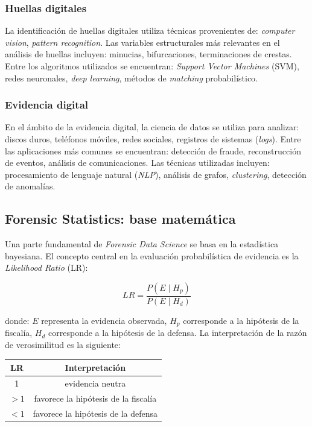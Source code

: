 \documentclass[a4paper,10pt,oneside]{article}
\begin{document}
\subsubsection*{Huellas digitales}

La identificaci\'on de huellas digitales utiliza t\'ecnicas provenientes de: \textit{computer vision}, \textit{pattern recognition}. Las variables estructurales m\'as relevantes en el an\'alisis de huellas incluyen: minucias, bifurcaciones, terminaciones de crestas. Entre los algoritmos utilizados se encuentran:  \textit{Support Vector Machines} (SVM), redes neuronales, \textit{deep learning}, m\'etodos de \textit{matching} probabil\'istico.

\subsubsection*{Evidencia digital}

En el \'ambito de la evidencia digital, la ciencia de datos se utiliza para analizar:  discos duros, tel\'efonos m\'oviles, redes sociales, registros de sistemas (\textit{logs}). Entre las aplicaciones m\'as comunes se encuentran: detecci\'on de fraude, reconstrucci\'on de eventos, an\'alisis de comunicaciones. Las t\'ecnicas utilizadas incluyen: procesamiento de lenguaje natural (\textit{NLP}), an\'alisis de grafos, \textit{clustering}, detecci\'on de anomal\'ias.

\subsection{Forensic Statistics: base matem\'atica}

Una parte fundamental de \textit{Forensic Data Science} se basa en la estad\'istica bayesiana.  El concepto central en la evaluaci\'on probabil\'istica de evidencia es la \textit{Likelihood Ratio} (LR):

\begin{equation}
LR = \frac{P(E \mid H_p)}{P(E \mid H_d)}
\end{equation}

donde: $E$ representa la evidencia observada, $H_p$ corresponde a la hip\'otesis de la fiscal\'ia, $H_d$ corresponde a la hip\'otesis de la defensa. La interpretaci\'on de la raz\'on de verosimilitud es la siguiente:

\begin{center}
\begin{tabular}{c c}
\hline
LR & Interpretaci\'on \\
\hline
1 & evidencia neutra \\
$>1$ & favorece la hip\'otesis de la fiscal\'ia \\
$<1$ & favorece la hip\'otesis de la defensa \\
\hline
\end{tabular}
\end{center}
\end{document}
